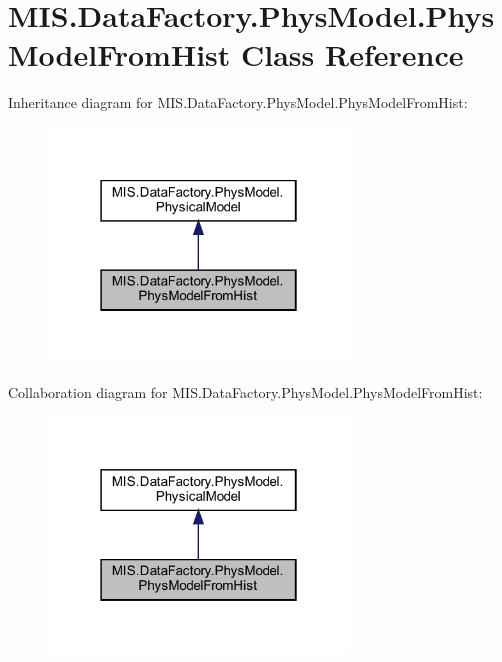 \hypertarget{classMIS_1_1DataFactory_1_1PhysModel_1_1PhysModelFromHist}{}\section{M\+I\+S.\+Data\+Factory.\+Phys\+Model.\+Phys\+Model\+From\+Hist Class Reference}
\label{classMIS_1_1DataFactory_1_1PhysModel_1_1PhysModelFromHist}


Inheritance diagram for M\+I\+S.\+Data\+Factory.\+Phys\+Model.\+Phys\+Model\+From\+Hist\+:
\nopagebreak
\begin{figure}[H]
\begin{center}
\leavevmode
\includegraphics[width=226pt]{classMIS_1_1DataFactory_1_1PhysModel_1_1PhysModelFromHist__inherit__graph}
\end{center}
\end{figure}


Collaboration diagram for M\+I\+S.\+Data\+Factory.\+Phys\+Model.\+Phys\+Model\+From\+Hist\+:
\nopagebreak
\begin{figure}[H]
\begin{center}
\leavevmode
\includegraphics[width=226pt]{classMIS_1_1DataFactory_1_1PhysModel_1_1PhysModelFromHist__coll__graph}
\end{center}
\end{figure}
